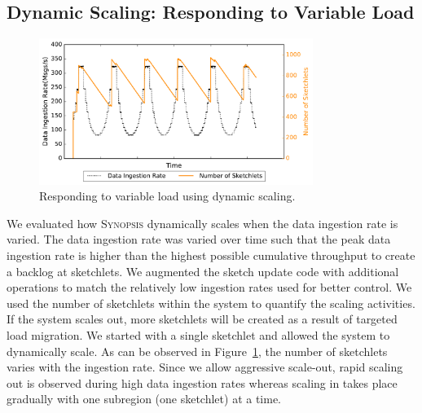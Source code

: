 \documentclass[9pt,journal,compsoc]{IEEEtran}
\begin{document}
\subsection{Dynamic Scaling: Responding to Variable Load}
%
\begin{figure}[b!]
    \centerline{\includegraphics[width=3.5in]{figures/dyn-scaling.pdf}}
    \caption{Responding to variable load using dynamic scaling.}
    \label{fig:dyn-scaling}
\end{figure}
%
We evaluated how \textsc{Synopsis} dynamically scales when the data ingestion rate is varied.
The data ingestion rate was varied over time such that the peak data ingestion rate is higher than the highest possible cumulative throughput to create a backlog at sketchlets.
We augmented the sketch update code with additional operations to match the relatively low ingestion rates used for better control.
We used the number of sketchlets within the system to quantify the scaling activities.
If the system scales out, more sketchlets will be created as a result of targeted load migration.
We started with a single sketchlet and allowed the system to dynamically scale.
As can be observed in Figure~\ref{fig:dyn-scaling}, the number of sketchlets varies with the ingestion rate.
Since we allow aggressive scale-out, rapid scaling out is observed during high data ingestion rates whereas scaling in takes place gradually with one subregion (one sketchlet) at a time.
\end{document}
